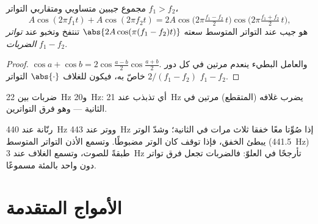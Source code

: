 \begin{proposition}[الضربات]\label{prop:b1:wave-propagation:beats}
مجموع جيبين متساويي  ومتقاربي التواتر
$f_1 > f_2$،
\[
A\cos(2\pi f_1 t) + A\cos(2\pi f_2 t)
= 2A\cos\!\big(2\pi\tfrac{f_1 - f_2}{2}\,t\big)\cos\!\big(2\pi\tfrac{f_1 + f_2}{2}\,t\big),
\]
هو جيب عند التواتر المتوسط سعته
$\abs{2A\cos(\pi(f_1 - f_2)t)}$ تنتفخ وتخبو عند \emph{تواتر
الضربات} $f_1 - f_2$.
\end{proposition}

\begin{proof}
$\cos a + \cos b = 2\cos\frac{a - b}{2}\cos\frac{a + b}{2}$. والعامل
البطيء ينعدم مرتين في كل دور $2/(f_1 - f_2)$ خاصّ به، فيكون
للغلاف $\abs{\cdot}$ التواتر $f_1 - f_2$.
\end{proof}

\begin{omfigure}

{\small ضربات بين \qty{22}{Hz} و\qty{20}{Hz}: أي تذبذب عند
\qty{21}{Hz} يضرب غلافه (المتقطع) مرتين في الثانية --- وهو
فرق التواترين.}
\end{omfigure}

\begin{example}\label{ex:b1:wave-propagation:tuning}
رنّانة عند \qty{440}{Hz} ووتر عند \qty{443}{Hz} إذا صُوِّتا
معًا خفقا ثلاث مرات في الثانية؛ وشدّ الوتر يبطئ
الخفق، فإذا توقف كان الوتر مضبوطًا. وتسمع الأذن التواتر المتوسط
(\qty{441.5}{Hz}) طبقةً للصوت، وتسمع الغلاف عند \qty{3}{Hz} تأرجحًا في
العلوّ: فالضربات تجعل فرق تواتر دون واحد بالمئة مسموعًا.
\end{example}

\section{الأمواج المتقدمة}

